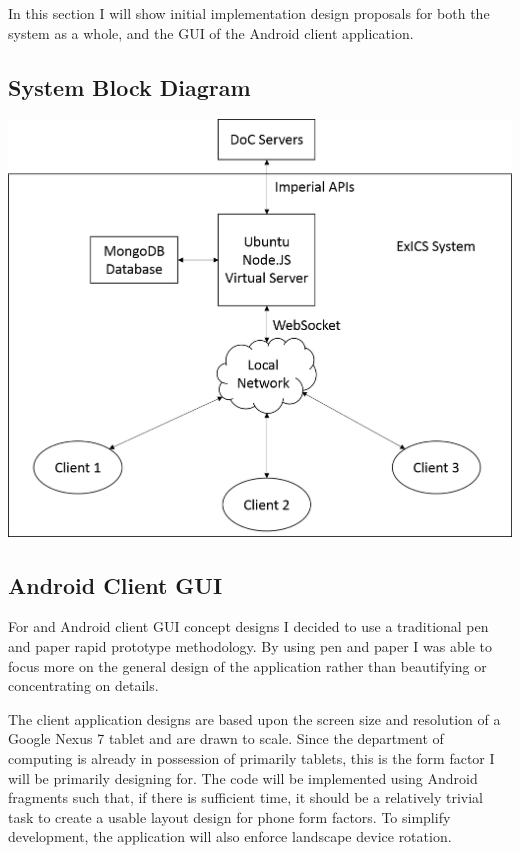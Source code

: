 \documentclass[a4paper, 12pt, notitlepage]{report}
\begin{document}
In this section I will show initial implementation design proposals for both the system as a whole, and the GUI of the Android client application.

\subsection{System Block Diagram}

\includegraphics[width=\textwidth]{"System Diagram/System Block Diagram"}

\subsection{Android Client GUI}

For and Android client GUI concept designs I decided to use a traditional pen and paper rapid prototype methodology.  By using pen and paper I was able to focus more on the general design of the application rather than beautifying or concentrating on details.

The client application designs are based upon the screen size and resolution of a Google Nexus 7 tablet and are drawn to scale.  Since the department of computing is already in possession of primarily tablets, this is the form factor I will be primarily designing for.  The code will be implemented using Android fragments\cite{fragments} such that, if there is sufficient time, it should be a relatively trivial task to create a usable layout design for phone form factors.  To simplify development, the application will also enforce landscape device rotation.
\end{document}
